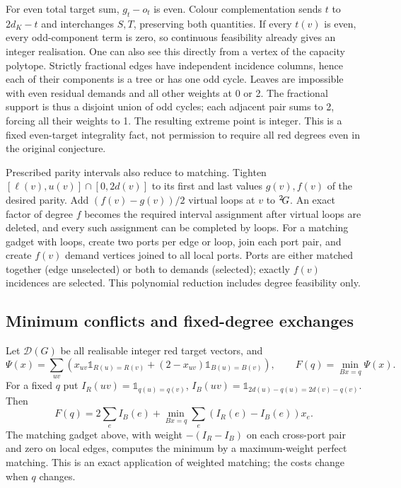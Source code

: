 For even total target sum, $g_t-o_t$ is even. Colour complementation
sends $t$ to $2d_K-t$ and interchanges $S,T$, preserving both
quantities. If every $t(v)$ is even, every odd-component term is
zero, so continuous feasibility already gives an integer realisation.
One can also see this directly from a vertex of the capacity polytope.
Strictly fractional edges have independent incidence columns, hence
each of their components is a tree or has one odd cycle. Leaves
are impossible with even residual demands and all other weights at
0 or 2. The fractional support is thus a disjoint union of odd cycles;
each adjacent pair sums to 2, forcing all their weights to 1.
The resulting extreme point is integer. This is a fixed even-target
integrality fact, not permission to require all red degrees even in
the original conjecture.

Prescribed parity intervals also reduce to matching. Tighten
$[\ell(v),u(v)]\cap[0,2d(v)]$ to its first and last values
$g(v),f(v)$ of the desired parity. Add $(f(v)-g(v))/2$ virtual loops
at $v$ to ${}^{2}\!G$. An exact factor of degree $f$ becomes the
required interval assignment after virtual loops are deleted, and
every such assignment can be completed by loops. For a matching
gadget with loops, create two ports per edge or loop, join each port
pair, and create $f(v)$ demand vertices joined to all local ports.
Ports are either matched together (edge unselected) or both to
demands (selected); exactly $f(v)$ incidences are selected. This
polynomial reduction includes degree feasibility only.

\subsection{Minimum conflicts and fixed-degree exchanges}

Let $\mathcal D(G)$ be all realisable integer red target vectors, and
\[
 \Psi(x)=\sum_{uv}\left(x_{uv}\mathbb{1}_{R(u)=R(v)}
 +(2-x_{uv})\mathbb{1}_{B(u)=B(v)}\right),\qquad
 F(q)=\min_{Bx=q}\Psi(x).
\]
For a fixed $q$ put $I_R(uv)=\mathbb{1}_{q(u)=q(v)}$,
$I_B(uv)=\mathbb{1}_{2d(u)-q(u)=2d(v)-q(v)}$. Then
\begin{equation}\label{eq:fixedcost}
 F(q)=2\sum_e I_B(e)+\min_{Bx=q}\sum_e (I_R(e)-I_B(e))x_e.
\end{equation}
The matching gadget above, with weight $-(I_R-I_B)$ on each
cross-port pair and zero on local edges, computes the minimum by
a maximum-weight perfect matching. This is an exact application of
weighted matching; the costs change when $q$ changes.

